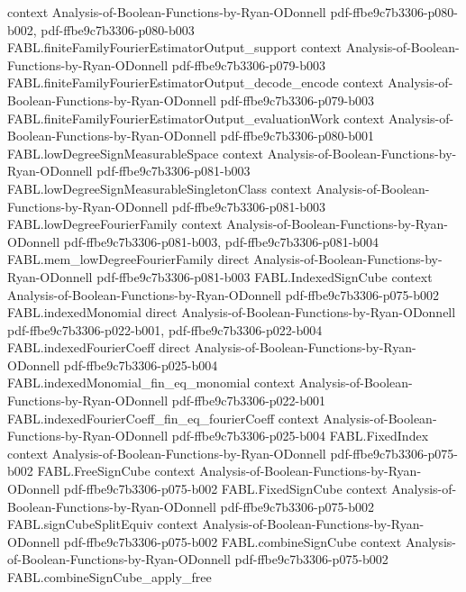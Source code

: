 \begin{theorem}
  {context}
  {Analysis-of-Boolean-Functions-by-Ryan-ODonnell}
  {pdf-ffbe9c7b3306-p080-b002,
    pdf-ffbe9c7b3306-p080-b003}
\proofstep
  {FABL.finiteFamilyFourierEstimatorOutput_support}
  {context}
  {Analysis-of-Boolean-Functions-by-Ryan-ODonnell}
  {pdf-ffbe9c7b3306-p079-b003}
\proofstep
  {FABL.finiteFamilyFourierEstimatorOutput_decode_encode}
  {context}
  {Analysis-of-Boolean-Functions-by-Ryan-ODonnell}
  {pdf-ffbe9c7b3306-p079-b003}
\proofstep
  {FABL.finiteFamilyFourierEstimatorOutput_evaluationWork}
  {context}
  {Analysis-of-Boolean-Functions-by-Ryan-ODonnell}
  {pdf-ffbe9c7b3306-p080-b001}
\proofstep
  {FABL.lowDegreeSignMeasurableSpace}
  {context}
  {Analysis-of-Boolean-Functions-by-Ryan-ODonnell}
  {pdf-ffbe9c7b3306-p081-b003}
\proofstep
  {FABL.lowDegreeSignMeasurableSingletonClass}
  {context}
  {Analysis-of-Boolean-Functions-by-Ryan-ODonnell}
  {pdf-ffbe9c7b3306-p081-b003}
\proofstep
  {FABL.lowDegreeFourierFamily}
  {context}
  {Analysis-of-Boolean-Functions-by-Ryan-ODonnell}
  {pdf-ffbe9c7b3306-p081-b003,
    pdf-ffbe9c7b3306-p081-b004}
\proofstep
  {FABL.mem_lowDegreeFourierFamily}
  {direct}
  {Analysis-of-Boolean-Functions-by-Ryan-ODonnell}
  {pdf-ffbe9c7b3306-p081-b003}
\proofstep
  {FABL.IndexedSignCube}
  {context}
  {Analysis-of-Boolean-Functions-by-Ryan-ODonnell}
  {pdf-ffbe9c7b3306-p075-b002}
\proofstep
  {FABL.indexedMonomial}
  {direct}
  {Analysis-of-Boolean-Functions-by-Ryan-ODonnell}
  {pdf-ffbe9c7b3306-p022-b001,
    pdf-ffbe9c7b3306-p022-b004}
\proofstep
  {FABL.indexedFourierCoeff}
  {direct}
  {Analysis-of-Boolean-Functions-by-Ryan-ODonnell}
  {pdf-ffbe9c7b3306-p025-b004}
\proofstep
  {FABL.indexedMonomial_fin_eq_monomial}
  {context}
  {Analysis-of-Boolean-Functions-by-Ryan-ODonnell}
  {pdf-ffbe9c7b3306-p022-b001}
\proofstep
  {FABL.indexedFourierCoeff_fin_eq_fourierCoeff}
  {context}
  {Analysis-of-Boolean-Functions-by-Ryan-ODonnell}
  {pdf-ffbe9c7b3306-p025-b004}
\proofstep
  {FABL.FixedIndex}
  {context}
  {Analysis-of-Boolean-Functions-by-Ryan-ODonnell}
  {pdf-ffbe9c7b3306-p075-b002}
\proofstep
  {FABL.FreeSignCube}
  {context}
  {Analysis-of-Boolean-Functions-by-Ryan-ODonnell}
  {pdf-ffbe9c7b3306-p075-b002}
\proofstep
  {FABL.FixedSignCube}
  {context}
  {Analysis-of-Boolean-Functions-by-Ryan-ODonnell}
  {pdf-ffbe9c7b3306-p075-b002}
\proofstep
  {FABL.signCubeSplitEquiv}
  {context}
  {Analysis-of-Boolean-Functions-by-Ryan-ODonnell}
  {pdf-ffbe9c7b3306-p075-b002}
\proofstep
  {FABL.combineSignCube}
  {context}
  {Analysis-of-Boolean-Functions-by-Ryan-ODonnell}
  {pdf-ffbe9c7b3306-p075-b002}
\proofstep
  {FABL.combineSignCube_apply_free}

\end{theorem}
